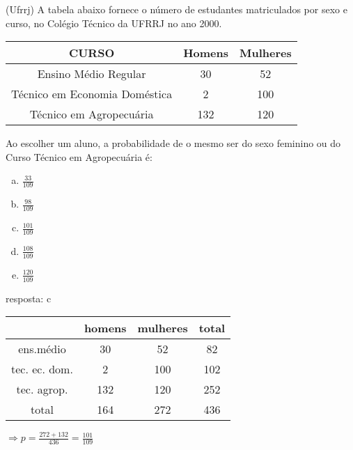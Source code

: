 \begin{ex}
(Ufrrj) A tabela abaixo fornece o número de estudantes matriculados por sexo e curso, no Colégio Técnico da UFRRJ no ano 2000.
  \begin{center}
      \begin{tabular}{|c|c|c|} \hline
          CURSO & Homens & Mulheres  \\ \hline
       Ensino Médio Regular & 30 & 52 \\ \hline
       Técnico em Economia Doméstica & 2 & 100 \\ \hline
       Técnico em Agropecuária & 132 & 120 \\ \hline
      \end{tabular}
  \end{center}
Ao escolher um aluno, a probabilidade de o mesmo ser do sexo feminino ou do Curso Técnico em Agropecuária é:
   \begin{enumerate}[(a)]
   \item $\frac{33}{109}$
   \item $\frac{98}{109}$
   \item $\frac{101}{109}$
   \item $\frac{108}{109}$
   \item $\frac{120}{109}$
   \end{enumerate}
     \begin{sol}
      resposta: c \\
      \begin{tabular}{|c|c|c|c|} \hline
           &homens &mulheres&total \\ \hline
         ens.médio  &30  & 52 & 82 \\  \hline 
         tec. ec. dom. &2 & 100 & 102 \\ \hline
         tec. agrop. & 132 &120 &252  \\  \hline
         total & 164 & 272 & 436 \\  \hline
      \end{tabular}
      $\Longrightarrow p=\frac{272+132}{436}=\frac{101}{109}$
     \end{sol}
\end{ex}